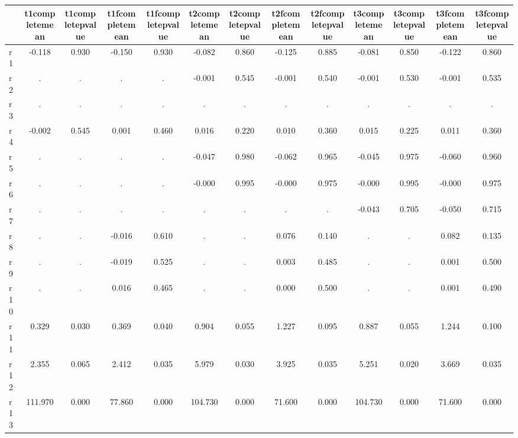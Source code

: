 \begin{table}[htbp]
\begin{tabular}{lcccccccccccc} \hline \hline
 & t1completemean  & t1completepvalue  & t1fcompletemean  & t1fcompletepvalue  & t2completemean  & t2completepvalue  & t2fcompletemean  & t2fcompletepvalue  & t3completemean  & t3completepvalue  & t3fcompletemean  & t3fcompletepvalue  \\  \hline 
r1 &    -0.118 &     0.930 &    -0.150 &     0.930 &    -0.082 &     0.860 &    -0.125 &     0.885 &    -0.081 &     0.850 &    -0.122 &     0.860 \\  
r2 &         . &         . &         . &         . &    -0.001 &     0.545 &    -0.001 &     0.540 &    -0.001 &     0.530 &    -0.001 &     0.535 \\  
r3 &         . &         . &         . &         . &         . &         . &         . &         . &         . &         . &         . &         . \\  
r4 &    -0.002 &     0.545 &     0.001 &     0.460 &     0.016 &     0.220 &     0.010 &     0.360 &     0.015 &     0.225 &     0.011 &     0.360 \\  
r5 &         . &         . &         . &         . &    -0.047 &     0.980 &    -0.062 &     0.965 &    -0.045 &     0.975 &    -0.060 &     0.960 \\  
r6 &         . &         . &         . &         . &    -0.000 &     0.995 &    -0.000 &     0.975 &    -0.000 &     0.995 &    -0.000 &     0.975 \\  
r7 &         . &         . &         . &         . &         . &         . &         . &         . &    -0.043 &     0.705 &    -0.050 &     0.715 \\  
r8 &         . &         . &    -0.016 &     0.610 &         . &         . &     0.076 &     0.140 &         . &         . &     0.082 &     0.135 \\  
r9 &         . &         . &    -0.019 &     0.525 &         . &         . &     0.003 &     0.485 &         . &         . &     0.001 &     0.500 \\  
r10 &         . &         . &     0.016 &     0.465 &         . &         . &     0.000 &     0.500 &         . &         . &     0.001 &     0.490 \\  
r11 &     0.329 &     0.030 &     0.369 &     0.040 &     0.904 &     0.055 &     1.227 &     0.095 &     0.887 &     0.055 &     1.244 &     0.100 \\  
r12 &     2.355 &     0.065 &     2.412 &     0.035 &     5.979 &     0.030 &     3.925 &     0.035 &     5.251 &     0.020 &     3.669 &     0.035 \\  
r13 &   111.970 &     0.000 &    77.860 &     0.000 &   104.730 &     0.000 &    71.600 &     0.000 &   104.730 &     0.000 &    71.600 &     0.000 \\  
\hline \hline \end{tabular}
\end{table}
